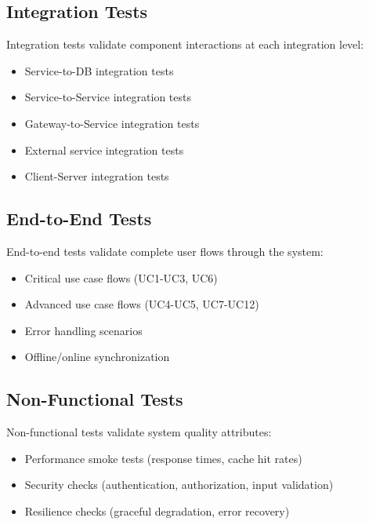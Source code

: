 \subsection{Integration Tests}
\label{subsec:integration_tests}%
Integration tests validate component interactions at each integration level:
\begin{itemize}
    \item Service-to-DB integration tests
    \item Service-to-Service integration tests
    \item Gateway-to-Service integration tests
    \item External service integration tests
    \item Client-Server integration tests
\end{itemize}

\subsection{End-to-End Tests}
\label{subsec:e2e_tests}%
End-to-end tests validate complete user flows through the system:
\begin{itemize}
    \item Critical use case flows (UC1-UC3, UC6)
    \item Advanced use case flows (UC4-UC5, UC7-UC12)
    \item Error handling scenarios
    \item Offline/online synchronization
\end{itemize}

\subsection{Non-Functional Tests}
\label{subsec:non_functional_tests}%
Non-functional tests validate system quality attributes:
\begin{itemize}
    \item Performance smoke tests (response times, cache hit rates)
    \item Security checks (authentication, authorization, input validation)
    \item Resilience checks (graceful degradation, error recovery)
\end{itemize}
